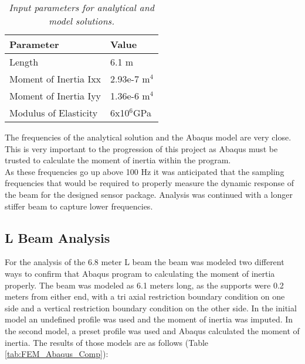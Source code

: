 \begin{table}
\begin{center}
\begin{tabular}{|l|l|}
\hline
\textbf{Parameter}    & \textbf{Value}     \\ \hline
Length                & 6.1 m         \\\hline
Moment of Inertia Ixx & 2.93e-7 m$^4$ \\\hline
Moment of Inertia Iyy & 1.36e-6 m$^4$ \\\hline
Modulus of Elasticity & 6x10$^6$GPa      \\\hline
\end{tabular}
\caption{\textit{Input parameters for analytical and model solutions.}}
\label{tab:FEM_inputs}
\end{center}
\end{table}

\indent The frequencies of the analytical solution and the Abaqus model are very close. This is very important to the progression of this project as Abaqus
must be trusted to calculate the moment of inertia within the program. \\
\indent As these frequencies go up above 100 Hz it was anticipated that the sampling frequencies that would be required to properly measure the dynamic
response of the beam for the designed sensor package. Analysis was continued with a longer stiffer beam to capture lower frequencies. 

\subsection{L Beam Analysis}
\indent For the analysis of the 6.8 meter L beam the beam was modeled two different ways to confirm that Abaqus program to calculating the moment of
inertia properly. The beam was modeled as 6.1 meters long, as the supports were 0.2 meters from either end, with a tri axial restriction boundary
condition on one side and a vertical restriction boundary condition on the other side. In the initial model an undefined profile was used and the moment
of inertia was imputed. In the second model, a preset profile was used and Abaqus calculated the moment of inertia. The results of those models are as
follows (Table \ref{tab:FEM_Abaqus_Comp}):\\

